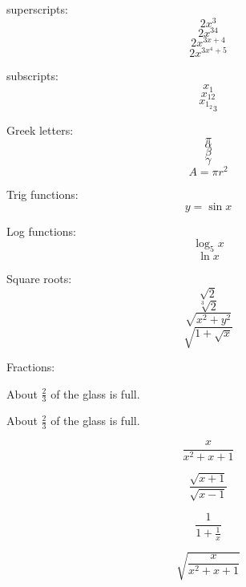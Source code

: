 \documentclass[11pt]{article}
\begin{document}
superscripts: 
$$2x^3$$
$$2x^{34}$$
$$2x^{3x+4}$$
$$2x^{3x^4+5}$$

subscripts: 
$$x_1$$
$$x_{12}$$
$${x_{1_2}}_3$$

Greek letters:
$$\pi$$
$$\alpha$$
$$\beta$$
$$\gamma$$
$$A=\pi r^2$$

Trig functions:
$$y=\sin{x}$$

Log functions:
$$\log_5{x}$$
$$\ln{x}$$

Square roots:
$$\sqrt{2}$$
$$\sqrt[3]{2}$$
$$\sqrt{x^2+y^2}$$
$$\sqrt{1+\sqrt{x}}$$

Fractions:

About $\frac{2}{3}$ of the glass is full.

About $\displaystyle{\frac{2}{3}}$ of the glass is full.

$$\frac{x}{x^2+x+1}$$

$$\frac{\sqrt{x+1}}{\sqrt{x-1}}$$

$$\frac{1}{1+\frac{1}{x}}$$

$$\sqrt{\frac{x}{x^2+x+1}}$$
\end{document}
